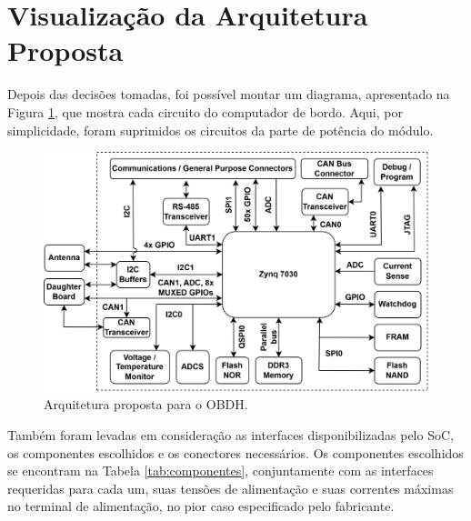 \section{Visualização da Arquitetura Proposta}

Depois das decisões tomadas, foi possível montar um diagrama, apresentado na Figura \ref{fig:arq}, que mostra cada circuito do computador de bordo. Aqui, por simplicidade, foram suprimidos os circuitos da parte de potência do módulo.

\begin{figure}[H]
    \centering
    \includegraphics[scale=1]{images/arquitetura final.png}
    \caption{Arquitetura proposta para o OBDH.}
    \label{fig:arq}
\end{figure}

Também foram levadas em consideração as interfaces disponibilizadas pelo SoC, os componentes escolhidos e os conectores necessários. Os componentes escolhidos se encontram na Tabela \ref{tab:componentes}, conjuntamente com as interfaces requeridas para cada um, suas tensões de alimentação e suas correntes máximas no terminal de alimentação, no pior caso especificado pelo fabricante.


